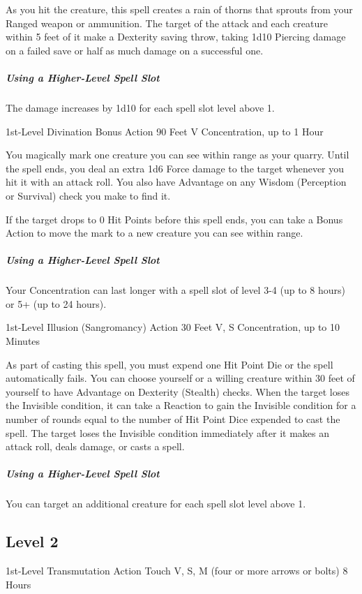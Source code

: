 \documentclass[letterpaper,openany,oneside,twocolumn]{book}
\begin{document}
As you hit the creature, this spell creates a rain of thorns that sprouts from your Ranged weapon or ammunition. The target of the attack and each creature within 5 feet of it make a Dexterity saving throw, taking 1d10 Piercing damage on a failed save or half as much damage on a successful one.

\subparagraph*{Using a Higher-Level Spell Slot} The damage increases by 1d10 for each spell slot level above 1.

	{1st-Level Divination}
	{Bonus Action}
	{90 Feet}
	{V}
	{Concentration, up to 1 Hour}

You magically mark one creature you can see within range as your quarry. Until the spell ends, you deal an extra 1d6 Force damage to the target whenever you hit it with an attack roll. You also have Advantage on any Wisdom (Perception or Survival) check you make to find it.

If the target drops to 0 Hit Points before this spell ends, you can take a Bonus Action to move the mark to a new creature you can see within range.

\subparagraph*{Using a Higher-Level Spell Slot} Your Concentration can last longer with a spell slot of level 3-4 (up to 8 hours) or 5+ (up to 24 hours).

	{1st-Level Illusion (Sangromancy)}
	{Action}
	{30 Feet}
	{V, S}
	{Concentration, up to 10 Minutes}

As part of casting this spell, you must expend one Hit Point Die or the spell automatically fails. You can choose yourself or a willing creature within 30 feet of yourself to have Advantage on Dexterity (Stealth) checks. When the target loses the Invisible condition, it can take a Reaction to gain the Invisible condition for a number of rounds equal to the number of Hit Point Dice expended to cast the spell. The target loses the Invisible condition immediately after it makes an attack roll, deals damage, or casts a spell.

\subparagraph*{Using a Higher-Level Spell Slot} You can target an additional creature for each spell slot level above 1.

\subsection*{Level 2}

	{1st-Level Transmutation}
	{Action}
	{Touch}
	{V, S, M (four or more arrows or bolts)}
	{8 Hours}
\end{document}
